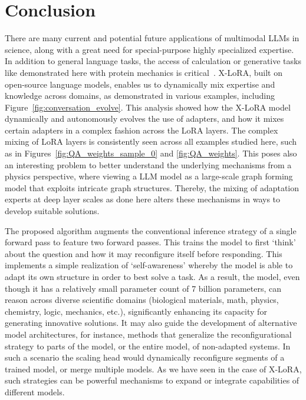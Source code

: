 \section{Conclusion}

There are many current and potential future applications of multimodal LLMs in science, along with a great need for special-purpose highly specialized expertise. In addition to general language tasks, the access of calculation or generative tasks like demonstrated here with protein mechanics is critical~\cite{Luu2023BioinspiredLLM:Materials,Buehler2023MechGPTModalities,Buehler2023MeLMProblemsb}. X-LoRA, built on open-source language models, enables us to dynamically mix expertise and knowledge across domains, as demonstrated in various examples, including Figure~\ref{fig:conversation_evolve}. This analysis showed how the X-LoRA model dynamically and autonomously evolves the use of adapters, and how it mixes certain adapters in a complex fashion across the LoRA layers. The complex mixing of LoRA layers is consistently seen across all examples studied here, such as in Figures~\ref{fig:QA_weights_sample_0} and \ref{fig:QA_weights}. This poses also an interesting problem to better understand the underlying mechanisms from a physics perspective, where viewing a LLM model as a large-scale graph forming model that exploits intricate graph structures. Thereby, the mixing of adaptation experts at deep layer scales as done here alters these mechanisms in ways to develop suitable solutions. 

The proposed algorithm augments the conventional inference strategy of a single forward pass to feature two forward passes. This trains the model to first `think' about the question and how it may reconfigure itself before responding. This implements a simple realization of `self-awareness’ whereby the model is able to adapt its own structure in order to best solve a task. As a result, the model, even though it has a relatively small parameter count of 7 billion parameters, can reason across diverse scientific domains (biological materials, math, physics, chemistry, logic, mechanics, etc.), significantly enhancing its capacity for generating innovative solutions. It may also guide the development of alternative model architectures, for instance, methods that generalize the reconfigurational strategy to parts of the model, or the entire model, of non-adapted systems. In such a scenario the scaling head would dynamically reconfigure segments of a trained model, or merge multiple models. As we have seen in the case of X-LoRA, such strategies can be powerful mechanisms to expand or integrate capabilities of different models.


